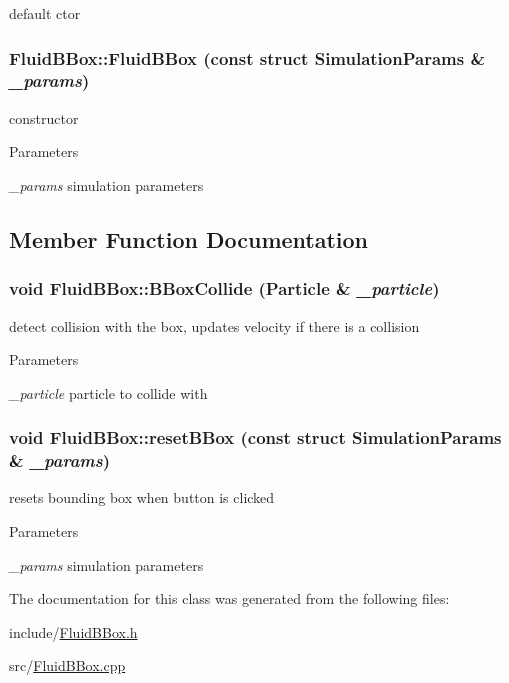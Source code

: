 default ctor \hypertarget{classFluidBBox_a7309a16e038c8798d2f2ac1242e84e15}{
\subsubsection[{FluidBBox}]{\setlength{\rightskip}{0pt plus 5cm}FluidBBox::FluidBBox (const struct {\bf SimulationParams} \& {\em \_\-params})}}
\label{classFluidBBox_a7309a16e038c8798d2f2ac1242e84e15}


constructor 
\begin{DoxyParams}{Parameters}
\item[{\em \_\-params}]simulation parameters \end{DoxyParams}


\subsection{Member Function Documentation}
\hypertarget{classFluidBBox_ae7da91cd968abc970301bec976db30d7}{
\subsubsection[{BBoxCollide}]{\setlength{\rightskip}{0pt plus 5cm}void FluidBBox::BBoxCollide ({\bf Particle} \& {\em \_\-particle})}}
\label{classFluidBBox_ae7da91cd968abc970301bec976db30d7}


detect collision with the box, updates velocity if there is a collision 
\begin{DoxyParams}{Parameters}
\item[{\em \_\-particle}]particle to collide with \end{DoxyParams}
\hypertarget{classFluidBBox_a48770a0ee9a759fed5d77182a95c7fc5}{
\subsubsection[{resetBBox}]{\setlength{\rightskip}{0pt plus 5cm}void FluidBBox::resetBBox (const struct {\bf SimulationParams} \& {\em \_\-params})}}
\label{classFluidBBox_a48770a0ee9a759fed5d77182a95c7fc5}


resets bounding box when button is clicked 
\begin{DoxyParams}{Parameters}
\item[{\em \_\-params}]simulation parameters \end{DoxyParams}


The documentation for this class was generated from the following files:\begin{DoxyCompactItemize}
\item 
include/\hyperlink{FluidBBox_8h}{FluidBBox.h}\item 
src/\hyperlink{FluidBBox_8cpp}{FluidBBox.cpp}\end{DoxyCompactItemize}
